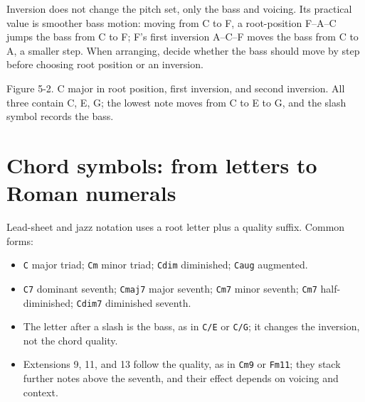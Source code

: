 Inversion does not change the pitch set, only the bass and voicing. Its practical value is smoother bass motion: moving from C to F, a root-position F--A--C jumps the bass from C to F; F's first inversion A--C--F moves the bass from C to A, a smaller step. When arranging, decide whether the bass should move by step before choosing root position or an inversion.

\begin{center}
\begin{minipage}{\linewidth}
\centering
{}

\small Figure 5-2. C major in root position, first inversion, and second inversion. All three contain C, E, G; the lowest note moves from C to E to G, and the slash symbol records the bass.
\end{minipage}
\end{center}

\section{Chord symbols: from letters to Roman numerals}

Lead-sheet and jazz notation uses a root letter plus a quality suffix. Common forms:

\begin{itemize}
  \item \texttt{C} major triad; \texttt{Cm} minor triad; \texttt{Cdim} diminished; \texttt{Caug} augmented.
  \item \texttt{C7} dominant seventh; \texttt{Cmaj7} major seventh; \texttt{Cm7} minor seventh; \texttt{Cm7} half-diminished; \texttt{Cdim7} diminished seventh.
  \item The letter after a slash is the bass, as in \texttt{C/E} or \texttt{C/G}; it changes the inversion, not the chord quality.
  \item Extensions 9, 11, and 13 follow the quality, as in \texttt{Cm9} or \texttt{Fm11}; they stack further notes above the seventh, and their effect depends on voicing and context.
\end{itemize}

